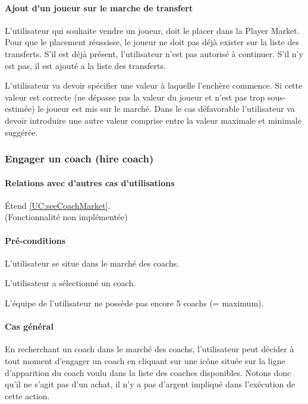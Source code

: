 \paragraph{Ajout d'un joueur sur le marche de transfert}
\begin{list}{}{\leftmargin=1.5em}
\item{L'utilisateur qui souhaite vendre un joueur, doit le placer dans la Player Market. Pour que le placement réussisse, le joueur ne doit pas déjà exister sur la liste des transferts. S'il est déjà présent, l'utilisateur n'est pas autorisé à continuer. S'il n'y est pas, il est ajouté a la liste des transferts.}
\item{L'utilisateur va devoir spécifier une valeur à laquelle l'enchère commence. Si cette valeur est correcte (ne dépasse pas la valeur du joueur et n'est pas trop sous-estimée) le joueur est mis sur le marché. Dans le cas défavorable l'utilisateur va devoir introduire une autre valeur comprise entre la valeur maximale et minimale suggérée.}
\end{list}

\subsubsection{Engager un coach (hire coach)}
\label{UC:hireCoach}
\paragraph{Relations avec d'autres cas d'utilisations}
Étend \ref{UC:seeCoachMarket}.
\\(Fonctionnalité non implémentée)
\paragraph{Pré-conditions}
\begin{list}{}{\leftmargin=1.5em}
\item{L'utilisateur se situe dans le marché des coachs.}
\item{L'utilisateur a sélectionné un coach.}
\item{L'équipe de l'utilisateur ne possède pas encore 5 coachs (= maximum).}
\end{list}
\paragraph{Cas général}
En recherchant un coach dans le marché des coachs, l'utilisateur peut décider à tout moment d'engager un coach en cliquant sur une icône située sur la ligne d'apparition du coach voulu dans la liste des coaches disponibles. Notons donc qu'il ne s'agit pas d'un achat, il n'y a pas d'argent impliqué dans l'exécution de cette action. 
